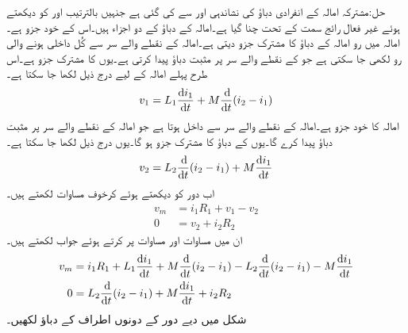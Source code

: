 حل:مشترکہ امالہ کے انفرادی دباؤ کی نشاندہی  اور  سے کی گئی ہے جنہیں بالترتیب  اور  کو دیکھتے ہوئے غیر فعال رائج سمت کے تحت چنا گیا ہے۔امالہ  کے دباؤ کے دو اجزاء ہیں۔اس کے خود جزو  ہے۔امالہ  میں رو امالہ  کے دباؤ کا مشترک جزو دیتی ہے۔امالہ  کے نقطے والے سر سے کُل داخلی ہونے والی رو  لکھی جا سکتی ہے جو  کے نقطے والے سر پر مثبت دباؤ پیدا کرتی ہے۔یوں  کا مشترک جزو  ہے۔اس طرح پہلے امالہ کے لیے درج ذیل لکھا جا سکتا ہے۔
\begin{align}\label{مساوات_مقناطیسی_مثال_مشترک_الف}
v_1=L_1 \frac{\dif i_1}{\dif t}+M\frac{\dif}{\dif t}(i_2-i_1)
\end{align}
امالہ  کا خود جزو  ہے۔امالہ  کے نقطے والے سر سے  داخل ہوتا ہے جو امالہ  کے نقطے والے سر پر مثبت دباؤ پیدا کرے گا۔یوں  کے دباؤ کا مشترک جزو  ہو گا۔یوں درج ذیل لکھا جا سکتا ہے۔
\begin{align}\label{مساوات_مقناطیسی_مثال_مشترک_ب}
v_2=L_2 \frac{\dif}{\dif t}(i_2-i_1)+M\frac{\dif i_1}{\dif t}
\end{align}
اب دور کو دیکھتے ہوئے کرخوف مساوات لکھتے ہیں۔
\begin{align}\label{مساوات_مقناطیسی_مثال_مشترک_پ}
v_m&=i_1 R_1+v_1-v_2\\
0&=v_2+i_2 R_2
\end{align}
ان میں مساوات  اور مساوات   پر کرتے ہوئے جواب لکھتے ہیں۔
\begin{align}
v_m&=i_1 R_1+L_1 \frac{\dif i_1}{\dif t}+M\frac{\dif}{\dif t}(i_2-i_1)-L_2 \frac{\dif}{\dif t}(i_2-i_1)-M\frac{\dif i_1}{\dif t}\\
0&=L_2 \frac{\dif}{\dif t}(i_2-i_1)+M\frac{\dif i_1}{\dif t}+i_2 R_2
\end{align}
شکل  میں دیے دور کے  دونوں اطراف کے دباؤ لکھیں۔
